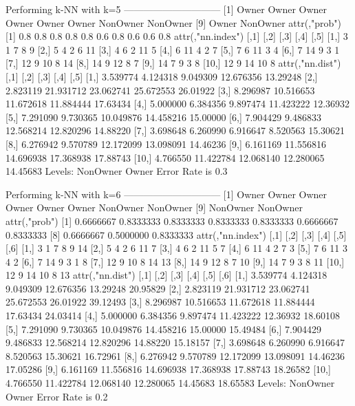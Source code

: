 \documentclass{article}
\begin{document}
\begin{Schunk}
\begin{Soutput}
Performing k-NN with k=5
 ------------------------------
 [1] Owner    Owner    Owner    Owner    Owner    Owner    NonOwner NonOwner
 [9] Owner    NonOwner
attr(,"prob")
 [1] 0.8 0.8 0.8 0.8 0.8 0.6 0.8 0.6 0.6 0.8
attr(,"nn.index")
      [,1] [,2] [,3] [,4] [,5]
 [1,]    3    1    7    8    9
 [2,]    5    4    2    6   11
 [3,]    4    6    2   11    5
 [4,]    6   11    4    2    7
 [5,]    7    6   11    3    4
 [6,]    7   14    9    3    1
 [7,]   12    9   10    8   14
 [8,]   14    9   12    8    7
 [9,]   14    7    9    3    8
[10,]   12    9   14   10    8
attr(,"nn.dist")
          [,1]      [,2]      [,3]      [,4]     [,5]
 [1,] 3.539774  4.124318  9.049309 12.676356 13.29248
 [2,] 2.823119 21.931712 23.062741 25.672553 26.01922
 [3,] 8.296987 10.516653 11.672618 11.884444 17.63434
 [4,] 5.000000  6.384356  9.897474 11.423222 12.36932
 [5,] 7.291090  9.730365 10.049876 14.458216 15.00000
 [6,] 7.904429  9.486833 12.568214 12.820296 14.88220
 [7,] 3.698648  6.260990  6.916647  8.520563 15.30621
 [8,] 6.276942  9.570789 12.172099 13.098091 14.46236
 [9,] 6.161169 11.556816 14.696938 17.368938 17.88743
[10,] 4.766550 11.422784 12.068140 12.280065 14.45683
Levels: NonOwner Owner
Error Rate is  0.3

Performing k-NN with k=6
 ------------------------------
 [1] Owner    Owner    Owner    Owner    Owner    Owner    NonOwner NonOwner
 [9] NonOwner NonOwner
attr(,"prob")
 [1] 0.6666667 0.8333333 0.8333333 0.8333333 0.8333333 0.6666667 0.8333333
 [8] 0.6666667 0.5000000 0.8333333
attr(,"nn.index")
      [,1] [,2] [,3] [,4] [,5] [,6]
 [1,]    3    1    7    8    9   14
 [2,]    5    4    2    6   11    7
 [3,]    4    6    2   11    5    7
 [4,]    6   11    4    2    7    3
 [5,]    7    6   11    3    4    2
 [6,]    7   14    9    3    1    8
 [7,]   12    9   10    8   14   13
 [8,]   14    9   12    8    7   10
 [9,]   14    7    9    3    8   11
[10,]   12    9   14   10    8   13
attr(,"nn.dist")
          [,1]      [,2]      [,3]      [,4]     [,5]     [,6]
 [1,] 3.539774  4.124318  9.049309 12.676356 13.29248 20.95829
 [2,] 2.823119 21.931712 23.062741 25.672553 26.01922 39.12493
 [3,] 8.296987 10.516653 11.672618 11.884444 17.63434 24.03414
 [4,] 5.000000  6.384356  9.897474 11.423222 12.36932 18.60108
 [5,] 7.291090  9.730365 10.049876 14.458216 15.00000 15.49484
 [6,] 7.904429  9.486833 12.568214 12.820296 14.88220 15.18157
 [7,] 3.698648  6.260990  6.916647  8.520563 15.30621 16.72961
 [8,] 6.276942  9.570789 12.172099 13.098091 14.46236 17.05286
 [9,] 6.161169 11.556816 14.696938 17.368938 17.88743 18.26582
[10,] 4.766550 11.422784 12.068140 12.280065 14.45683 18.65583
Levels: NonOwner Owner
Error Rate is  0.2


\end{Soutput}
\end{Schunk}
\end{document}

